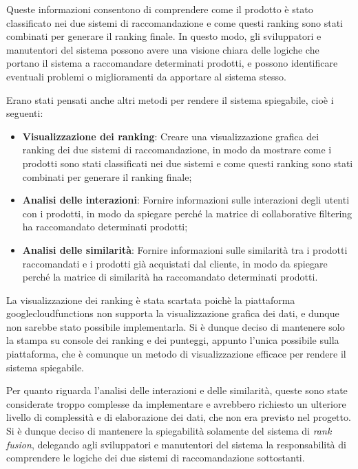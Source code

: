 Queste informazioni consentono di comprendere come il prodotto è stato classificato nei due sistemi di raccomandazione e come questi ranking sono stati combinati per generare il ranking finale. In questo modo, gli sviluppatori e manutentori del sistema possono avere una visione chiara delle logiche che portano il sistema a raccomandare determinati prodotti, e possono identificare eventuali problemi o miglioramenti da apportare al sistema stesso.

Erano stati pensati anche altri metodi per rendere il sistema spiegabile, cioè i seguenti:
\begin{itemize}
    \item \textbf{Visualizzazione dei ranking}: Creare una visualizzazione grafica dei ranking dei due sistemi di raccomandazione, in modo da mostrare come i prodotti sono stati classificati nei due sistemi e come questi ranking sono stati combinati per generare il ranking finale;
    \item \textbf{Analisi delle interazioni}: Fornire informazioni sulle interazioni degli utenti con i prodotti, in modo da spiegare perché la matrice di collaborative filtering ha raccomandato determinati prodotti;
    \item \textbf{Analisi delle similarità}: Fornire informazioni sulle similarità tra i prodotti raccomandati e i prodotti già acquistati dal cliente, in modo da spiegare perché la matrice di similarità ha raccomandato determinati prodotti.
\end{itemize}

La visualizzazione dei ranking è stata scartata poichè la piattaforma \gls{googlecloudfunctions} non supporta la visualizzazione grafica dei dati, e dunque non sarebbe stato possibile implementarla. Si è dunque deciso di mantenere solo la stampa su console dei ranking e dei punteggi, appunto l'unica possibile sulla piattaforma, che è comunque un metodo di visualizzazione efficace per rendere il sistema spiegabile.

Per quanto riguarda l'analisi delle interazioni e delle similarità, queste sono state considerate troppo complesse da implementare e avrebbero richiesto un ulteriore livello di complessità e di elaborazione dei dati, che non era previsto nel progetto.
Si è dunque deciso di mantenere la spiegabilità solamente del sistema di \emph{rank fusion}, delegando agli sviluppatori e manutentori del sistema la responsabilità di comprendere le logiche dei due sistemi di raccomandazione sottostanti.
